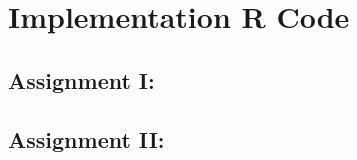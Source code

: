 \documentclass[12pt]{article}
\begin{document}
\newpage
\appendix
\section{Implementation R Code}
\subsection{Assignment I:}

\subsection{Assignment II: }

\end{document}
